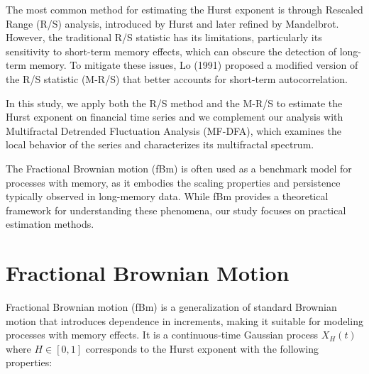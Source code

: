 \documentclass[11pt]{extarticle}
\begin{document}
The most common method for estimating the Hurst exponent is through Rescaled Range (R/S) analysis, introduced by Hurst
and later refined by Mandelbrot. However, the traditional R/S statistic has its limitations, particularly its
sensitivity to short-term memory effects, which can obscure the detection of long-term memory. To mitigate
these issues, Lo (1991) proposed a modified version of the R/S statistic (M-R/S) that better accounts for short-term autocorrelation.

In this study, we apply both the R/S method and the M-R/S to estimate the Hurst exponent on financial time series and we
complement our analysis with Multifractal Detrended Fluctuation Analysis (MF-DFA), which examines the local behavior of
the series and characterizes its multifractal spectrum.

The Fractional Brownian motion (fBm) is often used as a benchmark model for processes with memory, as it embodies the
scaling properties and persistence typically observed in long-memory data. While fBm provides a theoretical framework
for understanding these phenomena, our study focuses on practical estimation methods.

\section{Fractional Brownian Motion}

Fractional Brownian motion (fBm) is a generalization of standard Brownian motion that introduces dependence in increments,
making it suitable for modeling processes with memory effects. It is a continuous-time Gaussian process \( X_H(t) \)
where \( H \in [0, 1] \)  corresponds to the Hurst exponent with the following properties:
\end{document}
